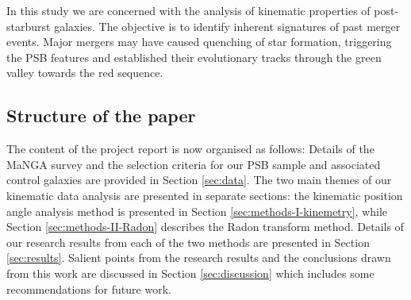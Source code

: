 In this study we are concerned with the analysis of kinematic properties of post-starburst galaxies. The objective is to identify inherent signatures of past merger events. Major mergers may have caused quenching of star formation, triggering the PSB features and established their evolutionary tracks through the green valley towards the red sequence. 

\subsection{Structure of the paper}
The content of the project report is now organised as follows: Details of the MaNGA survey and the selection criteria for our PSB sample and associated control galaxies are provided in Section \ref{sec:data}. The two main themes of our kinematic data analysis are presented in separate sections: the kinematic position angle  analysis method is presented in Section \ref{sec:methods-I-kinemetry}, while Section \ref{sec:methods-II-Radon} describes the Radon transform method. Details of our research results from each of the two methods are presented in Section \ref{sec:results}. Salient points from the research results and the conclusions drawn from this work are discussed in Section \ref{sec:discussion} which includes some recommendations for future work.
